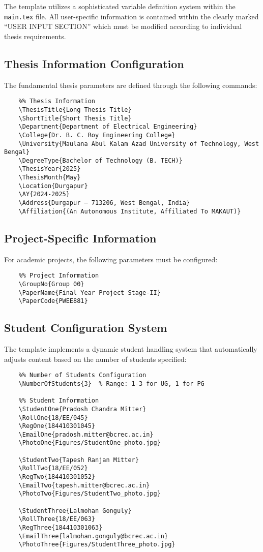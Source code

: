 The template utilizes a sophisticated variable definition system within the \texttt{main.tex} file. All user-specific information is contained within the clearly marked ``USER INPUT SECTION'' which must be modified according to individual thesis requirements.

\subsection{Thesis Information Configuration}
\label{subsec:thesis_info}

The fundamental thesis parameters are defined through the following commands:

\begin{verbatim}
	%% Thesis Information
	\ThesisTitle{Long Thesis Title}
	\ShortTitle{Short Thesis Title}
	\Department{Department of Electrical Engineering}
	\College{Dr. B. C. Roy Engineering College}
	\University{Maulana Abul Kalam Azad University of Technology, West Bengal}
	\DegreeType{Bachelor of Technology (B. TECH)}
	\ThesisYear{2025}
	\ThesisMonth{May}
	\Location{Durgapur}
	\AY{2024-2025}
	\Address{Durgapur – 713206, West Bengal, India}
	\Affiliation{(An Autonomous Institute, Affiliated To MAKAUT)}
\end{verbatim}

\subsection{Project-Specific Information}
\label{subsec:project_info}

For academic projects, the following parameters must be configured:

\begin{verbatim}
	%% Project Information
	\GroupNo{Group 00}
	\PaperName{Final Year Project Stage-II}
	\PaperCode{PWEE881}
\end{verbatim}

\subsection{Student Configuration System}
\label{subsec:student_config}

The template implements a dynamic student handling system that automatically adjusts content based on the number of students specified:

\begin{verbatim}
	%% Number of Students Configuration
	\NumberOfStudents{3}  % Range: 1-3 for UG, 1 for PG
	
	%% Student Information
	\StudentOne{Pradosh Chandra Mitter}
	\RollOne{18/EE/045}
	\RegOne{184410301045}
	\EmailOne{pradosh.mitter@bcrec.ac.in}
	\PhotoOne{Figures/StudentOne_photo.jpg}
	
	\StudentTwo{Tapesh Ranjan Mitter}
	\RollTwo{18/EE/052}
	\RegTwo{184410301052}
	\EmailTwo{tapesh.mitter@bcrec.ac.in}
	\PhotoTwo{Figures/StudentTwo_photo.jpg}
	
	\StudentThree{Lalmohan Gonguly}
	\RollThree{18/EE/063}
	\RegThree{184410301063}
	\EmailThree{lalmohan.gonguly@bcrec.ac.in}
	\PhotoThree{Figures/StudentThree_photo.jpg}
\end{verbatim}

